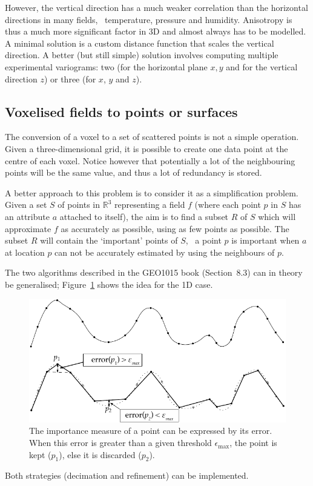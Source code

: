However, the vertical direction has a much weaker correlation than the horizontal directions in many fields, \eg\ temperature, pressure and humidity.
Anisotropy is thus a much more significant factor in 3D and almost always has to be modelled.
A minimal solution is a custom distance function that scales the vertical direction.
A better (but still simple) solution involves computing multiple experimental variograms: two (for the horizontal plane \(x,y\) and for the vertical direction \(z\)) or three (for \(x\), \(y\) and \(z\)).

\subsection{Voxelised fields to points or surfaces}

The conversion of a voxel to a set of scattered points is not a simple operation.
Given a three-dimensional grid, it is possible to create one data point at the centre of each voxel.
Notice however that potentially a lot of the neighbouring points will be the same value, and thus a lot of redundancy is stored.

%

A better approach to this problem is to consider it as a simplification problem.%
Given a set $S$ of points in $\mathbb{R}^3$ representing a field $f$ (where each point $p$ in $S$ has an attribute $a$ attached to itself), the aim is to find a subset $R$ of $S$ which will approximate $f$ as accurately as possible, using as few points as possible. 
The subset $R$ will contain the `important' points of $S$, \ie\ a point $p$ is important when $a$ at location $p$ can not be accurately estimated by using the neighbours of $p$.

%

The two algorithms described in the GEO1015 book (Section~8.3) can in theory be generalised; Figure~\ref{fig:meshsimplification} shows the idea for the 1D case.
\begin{figure}
  \centering
  \includegraphics[width=0.85\linewidth]{figs/mesh_simplification}
  \caption[The importance measure of a point expressed by its error]{The importance measure of a point can be expressed by its error. When this error is greater than a given threshold $\epsilon_{\max}$, the point is kept ($p_1$), else it is discarded ($p_2$).}%
\label{fig:meshsimplification}
\end{figure}
Both strategies (decimation and refinement) can be implemented.

